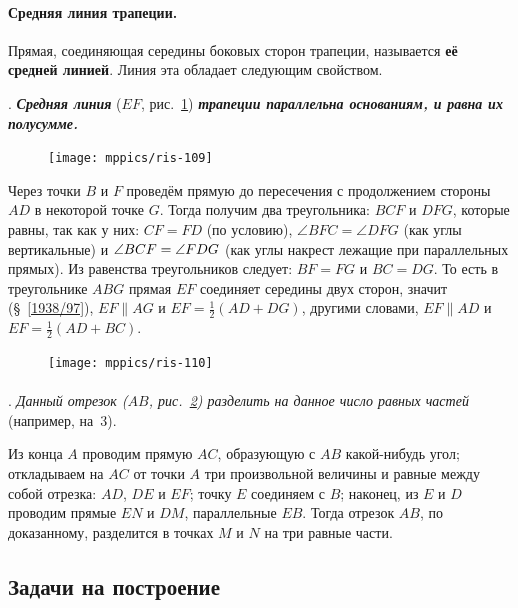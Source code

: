 \documentclass[twoside]{book}
\makeatletter
\newcommand{\rindex}[2][\imki@jobname]{%
  \index[#1]{\detokenize{#2}}%
}
\makeatother
\begin{document}
\paragraph{Средняя линия трапеции.}\label{1938/99}
Прямая, соединяющая середины боковых сторон трапеции, называется \rindex{средняя линия!трапеции}\textbf{её средней линией}.
Линия эта обладает следующим свойством.

\smallskip
\mbox{.}
\textbf{\emph{Средняя линия}} ($EF$, рис.~\ref{1938/ris-109}) \textbf{\emph{трапеции параллельна основаниям, и равна их полусумме.}}

\begin{figure}
\vskip-0mm
\centering
\texttt{[image: mppics/ris-109]}
\caption{}\label{1938/ris-109}
\end{figure}

Через точки $B$ и $F$ проведём прямую до пересечения с продолжением стороны $AD$ в некоторой точке $G$.
Тогда получим два треугольника:
$BCF$ и $DFG$, которые равны, так как у них:
$CF=FD$ (по условию), $\angle BFC=\angle DFG$ (как углы вертикальные) и $\angle BCF \z= \angle FDG$ (как углы накрест лежащие при параллельных прямых).
Из равенства треугольников следует:
$BF=FG$ и $BC=DG$.
То есть в треугольнике $ABG$ прямая $EF$ соединяет середины двух сторон, значит (§~\ref{1938/97}), $EF \parallel AG$ и $EF = \tfrac12(AD+DG)$, другими словами, $EF\parallel AD$ и $EF = \tfrac12(AD + BC)$.

\begin{figure}
\vskip-7mm
\centering
\texttt{[image: mppics/ris-110]}
\caption{}\label{1938/ris-110}
\end{figure}

\paragraph{}\label{1938/100}
\mbox{.}
\emph{Данный отрезок \emph{($AB$, рис.~\ref{1938/ris-110})} разделить на данное число равных частей} (например, на~3).

Из конца $A$ проводим прямую $AC$, образующую с $AB$ какой-нибудь угол;
откладываем на $AC$ от точки $A$ три произвольной величины и равные между собой отрезка:
$AD$, $DE$ и $EF$;
точку $E$ соединяем с $B$;
наконец, из $E$ и $D$ проводим прямые $EN$ и $DM$, параллельные $EB$.
Тогда отрезок $AB$, по доказанному, разделится в точках $M$ и $N$ на три равные части.

\subsection*{Задачи на построение}
\end{document}
